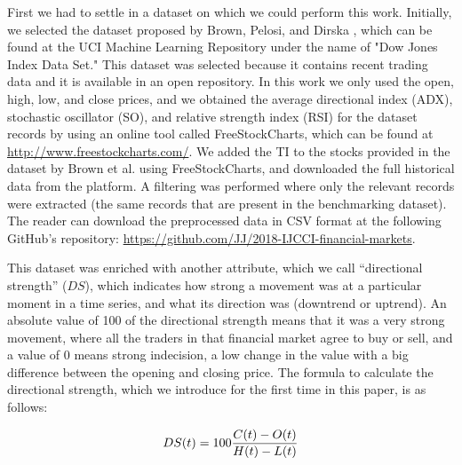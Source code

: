 \documentclass[a4paper,twoside]{article}
\begin{document}
First we had to settle in a dataset on which we could perform this
work. Initially, we selected the dataset proposed  by Brown, Pelosi, and
Dirska \cite{brown2013dynamic}, which can be found at the UCI Machine
Learning Repository under the name of "Dow Jones Index Data Set." 
This dataset was selected because it contains recent trading data
and it is available in an open repository.
In this work we only used the open, high, low, and close prices, and we
obtained the average directional index (ADX), stochastic oscillator
(SO), and relative strength index (RSI) for the dataset records by
using an online tool called FreeStockCharts, which can be found at
\url{http://www.freestockcharts.com/}. We added the TI to the stocks
provided in the dataset by Brown et al. using FreeStockCharts, and
downloaded the full historical data from the platform. A filtering was
performed where only the relevant records were extracted (the same
records that are present in the benchmarking dataset). The reader can
download the preprocessed data in CSV format at the following GitHub's
repository: \url{https://github.com/JJ/2018-IJCCI-financial-markets}. 

This dataset was enriched with another attribute, which we call
``directional strength'' ($DS$), which indicates how strong a movement was at
a particular moment in a time series, and 
what its direction was (downtrend or uptrend). An absolute value of
100 of the directional strength means that it was a very strong
movement, where all the traders in that financial market agree to buy
or sell, and a value of 0 means strong indecision, a low change in the
value with a big difference between the opening and closing price.
The formula to calculate the directional strength, which we introduce
for the first time in this paper, is as follows: 

\begin{equation} \label{directional-strength}
  DS(t) = 100{{C(t) - O(t)} \over {H(t) - L(t)}}
\end{equation}
\end{document}
